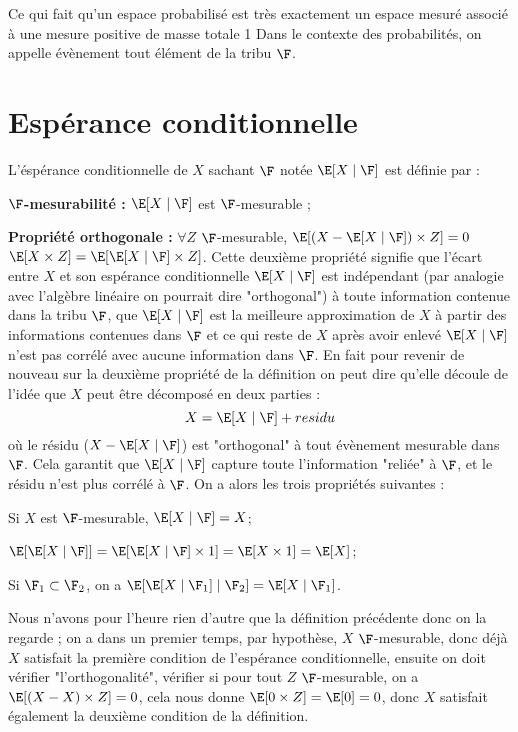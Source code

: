 \bn 
Ce qui fait qu'un espace probabilisé est très exactement un espace mesuré associé à une mesure positive de masse totale 1 
\en
\bn
Dans le contexte des probabilités, on appelle évènement tout élément de la tribu $\F$.
\en

    
    
\section{Espérance conditionnelle}

L'éspérance conditionnelle de $X$ sachant $\F$ notée $\E[X \mid \F]$ est définie par :
\ben
    \item \textbf{$\F$-mesurabilité :} $\E[X\mid \F]$ est $\F$-mesurable ;
    \item \textbf{Propriété orthogonale :} $\forall Z$ $\F$-mesurable, $\E[(X - \E[X \mid \F])\times Z ] = 0$ \ssi $\E[X\times Z] = \E[\E[X\mid \F] \times Z]$.
    \bn
    Cette deuxième propriété signifie que l'écart entre $X$ et son espérance conditionnelle $\E[X\mid \F]$ est indépendant (par analogie avec l'algèbre linéaire on pourrait dire "orthogonal") à toute information contenue dans la tribu $\F$, \ie que $\E[X\mid \F]$ est la meilleure approximation de $X$ à partir des informations contenues dans $\F$ et ce qui reste de $X$ après avoir enlevé $\E[X\mid \F]$ n'est pas corrélé avec aucune information dans $\F$.
    \en
\een
\ed
{} En fait pour revenir de nouveau sur la deuxième propriété de la définition on peut dire qu'elle découle de l'idée que $X$ peut être décomposé en deux parties : $$X = \E[X\mid \F] + residu$$ où le résidu ($X- \E[X\mid \F]$) est "orthogonal" à tout évènement mesurable dans $\F$. Cela garantit que $\E[X\mid \F]$ capture toute l'information "reliée" à $\F$, et le résidu n'est plus corrélé à $\F$.
\bp
On a alors les trois propriétés suivantes :
\ben
    \item Si $X$ est $\F$-mesurable, $\E[X\mid \F] = X$;
    \item $\E[\E[X\mid \F]] = \E[\E[X\mid \F]\times 1] = \E[X \times 1] = \E[X]$;
    \item Si $\F_1 \subset \F_2$, on a $\E[\E[X\mid \F_1]\mid \F_2] = \E[X\mid \F_1]$.
\een
\ep
\bpf[(esquisse)]
\ben
    \item Nous n'avons pour l'heure rien d'autre que la définition précédente donc on la regarde  ; on a dans un premier temps, par hypothèse, $X$ $\F$-mesurable, donc déjà $X$ satisfait la première condition de l'espérance conditionnelle, ensuite on doit vérifier "l'orthogonalité", \ie vérifier si pour tout $Z$ $\F$-mesurable, on a $\E[(X-X)\times Z] = 0$, cela nous donne $\E[0\times Z] =\E[0] = 0$, donc $X$ satisfait également la deuxième condition de la définition.
